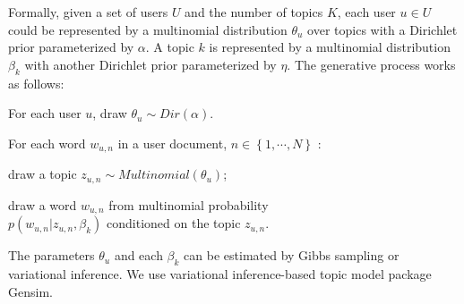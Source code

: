 \documentclass{acm_proc_article-sp}
\begin{document}
Formally, given a set of users $ U $ and the number of topics $ K $, each user $ u \in U $ could be represented by a multinomial distribution $ \theta_{u} $ over topics with a Dirichlet prior parameterized by $ \alpha $. 
A topic $ k $ is represented by a multinomial distribution $ \beta_{k} $ with another Dirichlet prior parameterized by $ \eta $. 
The generative process works as follows:
\begin{itemize*}
\item For each user $ u $, draw $ \theta_{u} \sim Dir \left(  \alpha \right) $.
\item For each word $ w_{u,n} $ in a user document, $ n \in \left\lbrace 1, \cdots, N \right\rbrace $ :
\begin{itemize*}
\item draw a topic $ z_{u,n} \sim Multinomial \left( \theta_{u}  \right) $;
\item draw a word $ w_{u,n} $ from multinomial probability\\ $  p \left( w_{u,n} \vert z_{u,n}, \beta_{k}  \right) $ conditioned on the topic $ z_{u,n} $.
\end{itemize*}
\end{itemize*}
The parameters $ \theta_{u} $ and each $ \beta_{k} $ can be estimated by Gibbs sampling or variational inference.
We use variational inference-based topic model package Gensim\cite{rehurek_lrec}.
\end{document}
